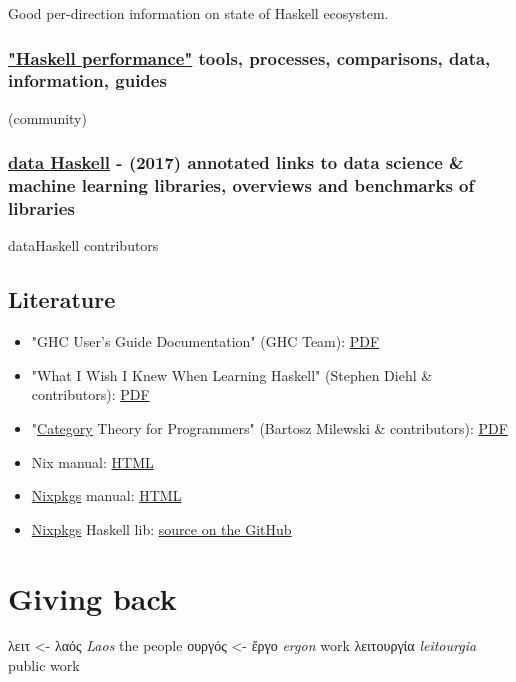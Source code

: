 \documentclass[a4paper,14pt,oneside]{book}
\begin{document}
Good per-direction information on state of Haskell ecosystem.

\section{\href{https://github.com/haskell-perf}{"Haskell performance"} tools, processes, comparisons, data, information, guides}
\label{sec:orgdc2b53c}
(community)

\section{\href{http://www.datahaskell.org/docs}{data Haskell} - (2017) annotated links to data science \& machine learning libraries, overviews and benchmarks of libraries}
\label{sec:orgb2664c8}
dataHaskell contributors

\chapter{Literature}
\label{sec:org0505d50}

\begin{itemize}
\item "GHC User’s Guide Documentation" (GHC Team): \href{https://downloads.haskell.org/\~ghc/latest/docs/users\_guide.pdf}{PDF}
\item "What I Wish I Knew When Learning Haskell" (Stephen Diehl \& contributors): \href{http://dev.stephendiehl.com/hask/tutorial.pdf}{PDF}
\item "\hyperref[org6bef484]{Category} Theory for Programmers" (Bartosz Milewski \& contributors): \href{https://s3.amazonaws.com/milewski-ctfp-pdf/category-theory-for-programmers.pdf}{PDF}
\item Nix manual: \href{https://nixos.org/nix/manual/}{HTML}
\item \hyperref[orgcad46b1]{Nixpkgs} manual: \href{https://nixos.org/nixpkgs/manual/}{HTML}
\item \hyperref[orgcad46b1]{Nixpkgs} Haskell lib: \href{https://github.com/NixOS/nixpkgs/blob/master/pkgs/development/haskell-modules/lib.nix}{source on the GitHub}
\end{itemize}

\part{Giving back}
\label{sec:org5a49b9f}

\textgreek{λειτ}       <- \textgreek{λαός}  \emph{Laos}       the people
    \textgreek{ουργός} <- \textgreek{ἔργο}  \emph{ergon}             work
\textgreek{λειτουργία}          \emph{leitourgia} public work
\end{document}
